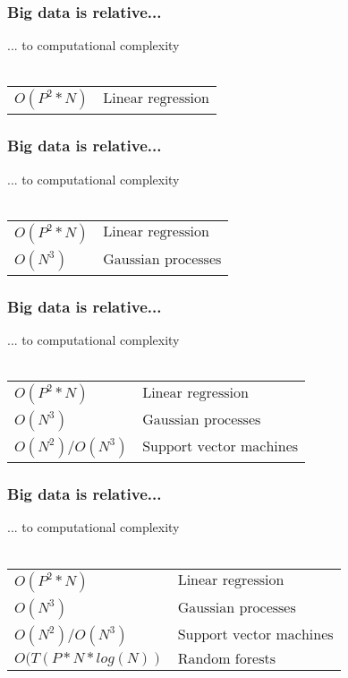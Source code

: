 \documentclass{beamer}
\begin{document}
\begin{frame}
	\frametitle{Big data is relative...}
	\begin{center}
		... to computational complexity\\~\\
		\begin{tabular}{ l l }
			$O(P^2 * N) $ & $ \text{Linear regression}$\\
		\end{tabular}
	\end{center}
\end{frame}

\begin{frame}
	\frametitle{Big data is relative...}
	\begin{center}
		... to computational complexity\\~\\
		\begin{tabular}{ l l }
			$O(P^2 * N) $ & $ \text{Linear regression}$\\
			$O(N^3) $ & $ \text{Gaussian processes}$\\
		\end{tabular}
	\end{center}
\end{frame}

\begin{frame}
	\frametitle{Big data is relative...}
	\begin{center}
		... to computational complexity\\~\\
		\begin{tabular}{ l l }
			$O(P^2 * N) $ & $ \text{Linear regression}$\\
			$O(N^3) $ & $ \text{Gaussian processes}$\\
			$O(N^2) / O(N^3) $ & $ \text{Support vector machines}$\\
		\end{tabular}
	\end{center}
\end{frame}

\begin{frame}
	\frametitle{Big data is relative...}
	\begin{center}
		... to computational complexity\\~\\
		\begin{tabular}{ l l }
			$O(P^2 * N) $ & $ \text{Linear regression}$\\
			$O(N^3) $ & $ \text{Gaussian processes}$\\
			$O(N^2) / O(N^3) $ & $ \text{Support vector machines}$\\
			$O(T(P * N * log(N)) $ & $ \text{Random forests}$\\
		\end{tabular}
	\end{center}
\end{frame}
\end{document}
